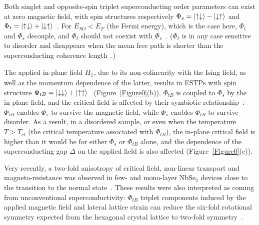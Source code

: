 \documentclass[showpacs,superscriptaddress,preprint,prb]{revtex4}
\begin{document}
Both singlet and opposite-spin triplet superconducting order parameters can exist at zero magnetic field, with spin structures respectively $ \Phi_s= \ket{\uparrow \downarrow} - \ket{\downarrow \uparrow}$ and $\Phi_t = \ket{\uparrow \downarrow} + \ket{\downarrow \uparrow}$~\cite{smidman2017}. For $E_{SO} < E_F$ (the Fermi energy), which is the case here, $ \Phi_t$ and $\Phi_s$ decouple, and $\Phi_t$ should not coexist with $\Phi_s$~\cite{rainer1998,haim2020}. ($\Phi_t$ is in any case sensitive to disorder and disappears when the mean free path is shorter than the superconducting coherence length~\cite{mockli2020}.)

The applied in-plane field $H_{||}$, due to its non-colinearity with the Ising field, as well as the momentum dependence of the latter, results in ESTPs with spin structure $\Phi_{tB}= \ket{\downarrow  \downarrow} + \ket{\uparrow \uparrow} $~\cite{mockli2020, tang2020, nakamura2017} (Figure~\ref{Figure0}(b)). $\Phi_{tB}$ is coupled to $\Phi_{s}$ by the in-plane field, and the critical field is affected by their symbiotic relationship~\cite{mockli2019}: $\Phi_{tB}$ enables $\Phi_{s}$ to survive the magnetic field, while $\Phi_{s}$ enables $\Phi_{tB}$ to survive disorder. As a result, in a disordered sample, or even when the temperature $T>T_{ct}$ (the critical temperature associated with $\Phi_{tB}$), the in-plane critical field is higher than it would be for either $\Phi_{s}$ or $\Phi_{tB}$ alone, and the dependence of the superconducting gap $\Delta$ on the applied field is also affected (Figure~\ref{Figure0}(c)).

Very recently, a two-fold anisotropy of critical field, non-linear transport and magneto-resistance was observed in few- and mono-layer NbSe$_2$ devices close to the transition to the normal state~\cite{Hamill_2020,Cho_Lortz_2020}. These results were also interpreted as coming from unconventional superconductivity: $\Phi_{tB}$ triplet components induced by the applied magnetic field and lateral lattice strain can reduce the six-fold rotational symmetry expected from the hexagonal crystal lattice to two-fold symmetry~\cite{Hamill_2020,Cho_Lortz_2020,haim2022}. 
\end{document}
